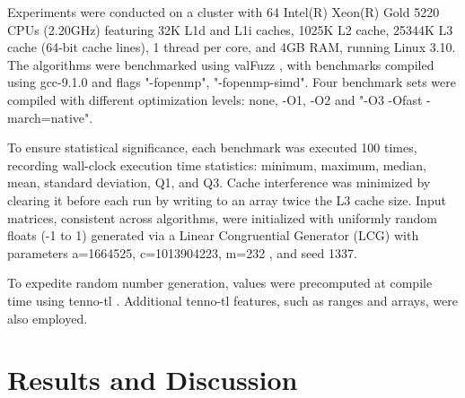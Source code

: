 \documentclass[conference]{IEEEtran}
\begin{document}
Experiments were conducted on a cluster with 64 Intel(R) Xeon(R) Gold 5220 CPUs (2.20GHz) featuring 32K L1d and L1i caches, 1025K L2 cache, 25344K L3 cache (64-bit cache lines), 1 thread per core, and 4GB RAM, running Linux 3.10. The algorithms were benchmarked using valFuzz \cite{b24}, with benchmarks compiled using gcc-9.1.0 and flags "-fopenmp", "-fopenmp-simd". Four benchmark sets were compiled with different optimization levels: none, -O1, -O2 and "-O3 -Ofast -march=native".

To ensure statistical significance, each benchmark was executed 100 times, recording wall-clock execution time statistics: minimum, maximum, median, mean, standard deviation, Q1, and Q3. Cache interference was minimized by clearing it before each run by writing to an array twice the L3 cache size. Input matrices, consistent across algorithms, were initialized with uniformly random floats (-1 to 1) generated via a Linear Congruential Generator (LCG) \cite{b25} with parameters a=1664525, c=1013904223, m=232 \cite{b26}, and seed 1337.

To expedite random number generation, values were precomputed at compile time using tenno-tl \cite{b27}. Additional tenno-tl features, such as ranges and arrays, were also employed.

\section{Results and Discussion}

\end{document}
